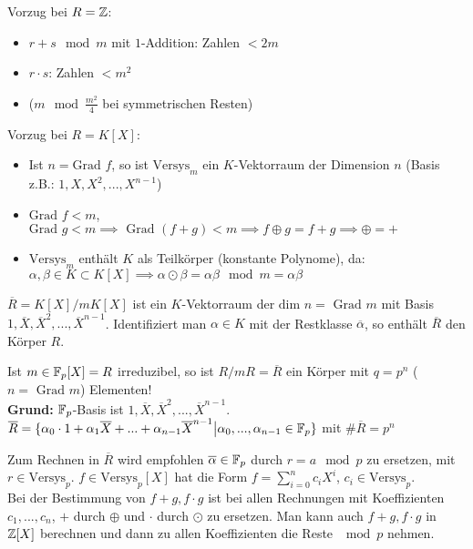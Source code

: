 \documentclass[a4paper,twoside,DIV15,BCOR12mm]{scrbook}
\begin{document}
Vorzug bei $R = \mathbb{Z}$:
\begin{itemize}
    \item[] $r+s \mod m$ mit $1$-Addition: Zahlen $< 2m$
    \item[] $r\cdot s$: Zahlen $<m^2$
    \item[] ($m \mod \frac{m^2}{4}$ bei symmetrischen Resten)
\end{itemize}

Vorzug bei $R = K[X]$:
\begin{itemize}
    \item[] Ist $n = \text{Grad }f$, so ist $\text{Versys}_m$ ein $K$-Vektorraum der Dimension $n$ (Basis z.B.: $1, X, X^2, ..., X^{n-1}$)
    \item[] $\text{Grad }f < m$, $\text{Grad }g < m \implies \text{ Grad } (f+g) < m \implies f \oplus g = f + g \implies \oplus = +$
    \item[] $\text{Versys}_m$ enthält $K$ als Teilkörper (konstante Polynome), da:\\
    $\alpha, \beta \in K \subset K[X] \implies \alpha \odot \beta = \alpha \beta \mod m = \alpha\beta$
\end{itemize}

\begin{folgerung}
    $\overline R = K[X]/mK[X]$ ist ein $K$-Vektorraum der $\text{dim }n = \text{ Grad }m$ mit Basis $1, \overline X, \overline X^2, ..., \overline X^{n-1}$. Identifiziert man $\alpha \in K$ mit der Restklasse $\overline \alpha$, so enthält $\overline R$ den Körper $R$.
\end{folgerung}

\begin{folgerung}
    Ist $m \in \mathbb{F}_p[X] = R$ irreduzibel, so ist $R/mR = \overline R$ ein Körper mit $q = p^n$ ($n = \text{ Grad }m$) Elementen!\\
    \textbf{Grund:} $\mathbb{F}_p$-Basis ist $1, \overline X, \overline X^2, ... , \overline X^{n-1}$.\\
    $\overline R = \{\alpha_0 \cdot 1 + \alpha_1 \overline X +... + \alpha_{n-1} \overline X^{n-1} \big| \alpha_0,...,\alpha_{n-1} \in \mathbb{F}_p\}$ mit $\# \overline R = p^n$
\end{folgerung}

Zum Rechnen in $\overline R$ wird empfohlen $\overline \alpha \in \mathbb{F}_p$ durch $r = a \mod p$ zu ersetzen, mit $r \in \text{Versys}_p$. $f \in \text{Versys}_p[X]$ hat die Form $f = \sum_{i=0}^n c_iX^i$, $c_i \in \text{Versys}_p$. \\
Bei der Bestimmung von $f+g, f\cdot g$ ist bei allen Rechnungen mit
Koeffizienten $c_1,...,c_n$, $+$ durch $\oplus$ und $\cdot$ durch
$\odot$ zu ersetzen. Man kann auch $f+g, f\cdot g$ in $\mathbb{Z}[X]$
berechnen und dann zu allen Koeffizienten die Reste $\mod p$ nehmen.
\end{document}
